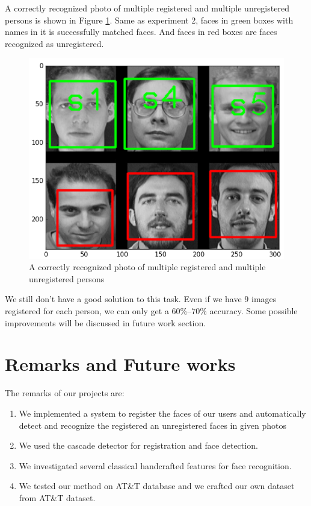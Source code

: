 \documentclass[paper=a4, fontsize=11pt]{scrartcl} %
\numberwithin{equation}{section} %
\numberwithin{figure}{section} %
\numberwithin{table}{section} %
\begin{document}
A correctly recognized photo of multiple registered and multiple unregistered persons is shown in Figure \ref{fig:rec_multi_unreg}.  Same as experiment 2, faces in green boxes with names in it is successfully matched faces. And faces in red boxes are faces recognized as unregistered.

\begin{figure}[!htbp]
	\centering
	\includegraphics[width=5in]{rec_multi_unreg.png}
	\caption{A correctly recognized photo of multiple registered and multiple unregistered persons}
	\label{fig:rec_multi_unreg}
\end{figure}

We still don't have a good solution to this task. Even if we have $9$ images registered for each person, we can only get a $60\%$--$70\%$ accuracy. Some possible improvements will be discussed in future work section.

\section{Remarks and Future works}
The remarks of our projects are:
\begin{enumerate}
	\item We implemented a system to register the faces of our users and automatically detect and recognize the registered an unregistered faces in given photos
	\item We used the cascade detector for registration and face detection.
	\item We investigated several classical handcrafted features for face recognition.
	\item We tested our method on AT\&T database and we crafted our own dataset from AT\&T dataset.
\end{enumerate}
\end{document}
